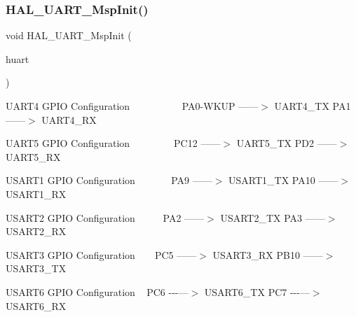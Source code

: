 \subsubsection{\texorpdfstring{H\+A\+L\+\_\+\+U\+A\+R\+T\+\_\+\+Msp\+Init()}{HAL\_UART\_MspInit()}}
{\footnotesize\ttfamily void H\+A\+L\+\_\+\+U\+A\+R\+T\+\_\+\+Msp\+Init (\begin{DoxyParamCaption}\item[{\mbox{\hyperlink{struct_u_a_r_t___handle_type_def}{U\+A\+R\+T\+\_\+\+Handle\+Type\+Def}} $\ast$}]{huart }\end{DoxyParamCaption})}

U\+A\+R\+T4 G\+P\+IO Configuration ~\newline
~\newline
~\newline
~\newline
~\newline
~\newline
P\+A0-\/\+W\+K\+UP ------$>$ U\+A\+R\+T4\+\_\+\+TX P\+A1 ------$>$ U\+A\+R\+T4\+\_\+\+RX

U\+A\+R\+T5 G\+P\+IO Configuration ~\newline
~\newline
~\newline
~\newline
~\newline
P\+C12 ------$>$ U\+A\+R\+T5\+\_\+\+TX P\+D2 ------$>$ U\+A\+R\+T5\+\_\+\+RX

U\+S\+A\+R\+T1 G\+P\+IO Configuration ~\newline
~\newline
~\newline
~\newline
P\+A9 ------$>$ U\+S\+A\+R\+T1\+\_\+\+TX P\+A10 ------$>$ U\+S\+A\+R\+T1\+\_\+\+RX

U\+S\+A\+R\+T2 G\+P\+IO Configuration ~\newline
~\newline
~\newline
P\+A2 ------$>$ U\+S\+A\+R\+T2\+\_\+\+TX P\+A3 ------$>$ U\+S\+A\+R\+T2\+\_\+\+RX

U\+S\+A\+R\+T3 G\+P\+IO Configuration ~\newline
~\newline
P\+C5 ------$>$ U\+S\+A\+R\+T3\+\_\+\+RX P\+B10 ------$>$ U\+S\+A\+R\+T3\+\_\+\+TX

U\+S\+A\+R\+T6 G\+P\+IO Configuration ~\newline
P\+C6 -\/-\/-\/---$>$ U\+S\+A\+R\+T6\+\_\+\+TX P\+C7 -\/-\/-\/---$>$ U\+S\+A\+R\+T6\+\_\+\+RX